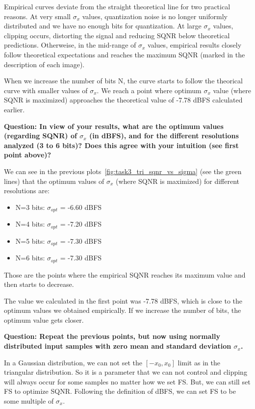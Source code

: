 \documentclass[11pt,a4paper]{article}
\begin{document}
Empirical curves deviate from the straight theoretical line for two practical reasons. At very small $\sigma_x$ values, quantization noise is no longer uniformly distributed and we have no enough bits for quantization.
At large $\sigma_x$ values, clipping occurs, distorting the signal and reducing SQNR below theoretical predictions.
Otherweise, in the mid-range of $\sigma_x$ values, empirical results closely follow theoretical expectations and reaches the maximum SQNR (marked in the description of each image).

When we increase the number of bits N, the curve starts to follow the theorical curve with smaller values of $\sigma_x$.
We reach a point where optimum $\sigma_x$ value (where SQNR is maximized) approaches the theoretical value of -7.78 dBFS calculated earlier.

\vspace{1cm}
\textbf{Question: In view of your results, what are the optimum values (regarding SQNR) of $\sigma_x$ (in dBFS), and for the different resolutions analyzed (3 to 6 bits)?
    Does this agree with your intuition (see first point above)?
}
\vspace{0.5cm}

We can see in the previous plots~\ref{fig:task3_tri_sqnr_vs_sigma} (see the green lines) that the optimum values of $\sigma_x$ (where SQNR is maximized) for different resolutions are:
\begin{itemize}
    \item N=3 bits: $\sigma_{opt}$ = -6.60 dBFS
    \item N=4 bits: $\sigma_{opt}$ = -7.20 dBFS
    \item N=5 bits: $\sigma_{opt}$ = -7.30 dBFS
    \item N=6 bits: $\sigma_{opt}$ = -7.30 dBFS
\end{itemize}
Those are the points where the empirical SQNR reaches its maximum value and then starts to decrease.

The value we calculated in the first point was -7.78 dBFS, which is close to the optimum values we obtained empirically.
If we increase the number of bits, the optimum value gets closer.

\vspace{1cm}
\textbf{Question: Repeat the previous points, but now using normally distributed input samples with zero mean and standard deviation $\sigma_x$.
}
\vspace{0.5cm}

In a Gaussian distribution, we can not set the $[-x_0,x_0]$ limit as in the triangular distribution. So it is a parameter that we can not control and clipping will always occur for some samples no matter how we set FS.
But, we can still set FS to optimize SQNR. Following the definition of dBFS, we can set FS to be some multiple of $\sigma_x$.
\end{document}
